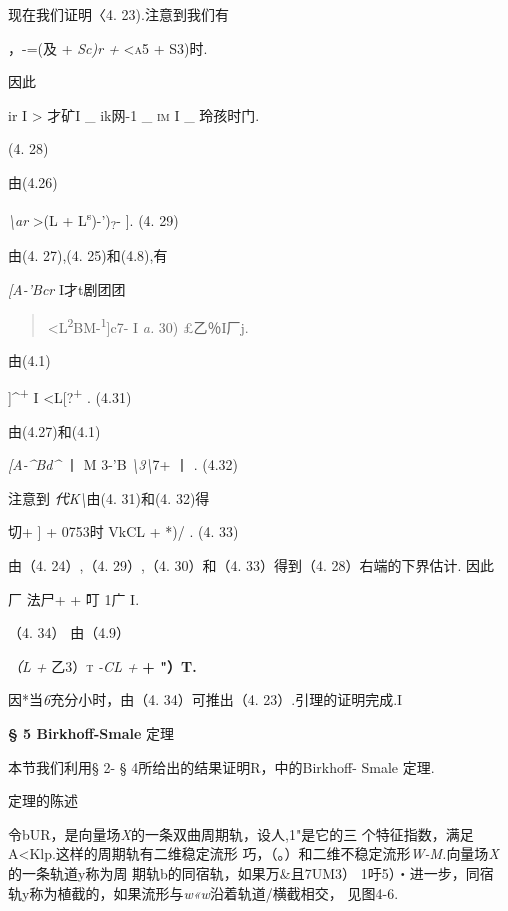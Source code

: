 \documentclass{article}
\begin{document}
现在我们证明〈4. 23).注意到我们有

，-=(及 + \emph{Sc)r +} \textsc{\textless{}a5} + S3)时.

因此

ir I \textgreater{} \textbar{}才\textbar{}{[}\textbar{}矿I \_ ik网-1 \_
\textsc{im} I \_ \textbar{}玲孩时门.

(4. 28)

由(4.26)

\emph{\textbackslash{}ar} \textbar{}\textgreater{}(L +
L\textsuperscript{s})-')\textsubscript{?}- {]}. (4. 29)

由(4. 27),(4. 25)和(4.8),有

\emph{{[}A-'Bcr} I才t剧团团

\begin{quote}
\textless{}L\textsuperscript{2}\textbar{}BM-\textsuperscript{1}{]}\textbar{}c\textbar{}\textbar{}7-
I \emph{a.} 30) £乙％I厂j.
\end{quote}

由(4.1)

{]}\^{}\textsuperscript{+} I \textless{}L{[}?\textsuperscript{+}
\textbar{}. (4.31)

由(4.27)和(4.1)

\emph{{[}A-\^{}Bd\^{}} 丨 M \textbar{}3-'B\textbar{}
\emph{\textbackslash{}3\textbackslash{}}\textbar{}7+ 丨 \textbar{}.
(4.32)

注意到 \emph{代K\textbackslash{}}由(4. 31)和(4. 32)得

\textbar{}切+ {]} + 0753时 \textbar{} VkCL + *)/ \textbar{}. (4. 33)

由（4. 24）,（4. 29）,（4. 30）和（4. 33）得到（4. 28）右端的下界估计.
因此

\textbar{}厂 \textbar{}法尸+ + 叮 1广 I.

（4. 34） 由（4.9）

\emph{（L +} 乙\textsc{3）t} \emph{-CL +} \textbf{+ "）T.}

因*当\emph{6}充分小时，由（4. 34）可推出（4. 23）.引理的证明完成.I

\protect\hypertarget{bookmark225}{}{}\textbf{§ 5 Birkhoff-Smale} 定理

本节我们利用§ 2- § 4所给出的结果证明R，中的Birkhoff- Smale 定理.

定理的陈述

令bUR，是向量场\emph{X}的一条双曲周期轨，设人,1"是它的三
个特征指数，满足\textbar{}A\textbar{}\textless{}Klp\textbar{}.这样的周期轨有二维稳定流形
巧，（。）和二维不稳定流形\emph{W-M.}向量场\emph{X}的一条轨道y称为周
期轨b的同宿轨，如果万\&且7UM3） 1吁5）・进一步，同宿
轨y称为植截的，如果流形与\emph{w«w}沿着轨道/横截相交， 见图4-6.
\end{document}
